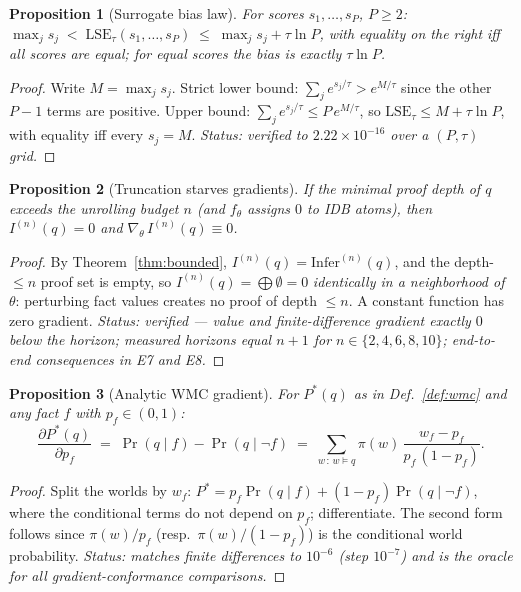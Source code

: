 \documentclass[10pt]{article}
\newtheorem{proposition}{Proposition}
\theoremstyle{remark}
\newcommand{\Infer}{\mathrm{Infer}}
\begin{document}
\begin{proposition}[Surrogate bias law]\label{prop:lse}
For scores $s_1,\dots,s_P$, $P \ge 2$:
$\max_j s_j \;<\; \mathrm{LSE}_\tau(s_1,\dots,s_P) \;\le\; \max_j s_j + \tau\ln P$,
with equality on the right iff all scores are equal; for equal scores the bias is exactly
$\tau\ln P$.
\end{proposition}
\begin{proof}
Write $M = \max_j s_j$. Strict lower bound: $\sum_j e^{s_j/\tau} > e^{M/\tau}$ since the other
$P-1$ terms are positive. Upper bound: $\sum_j e^{s_j/\tau} \le P\,e^{M/\tau}$, so
$\mathrm{LSE}_\tau \le M + \tau\ln P$, with equality iff every $s_j = M$. \emph{Status: verified to
$2.22\times10^{-16}$ over a $(P,\tau)$ grid.}
\end{proof}

\begin{proposition}[Truncation starves gradients]\label{prop:trunc}
If the minimal proof depth of $q$ exceeds the unrolling budget $n$ (and $f_\theta$ assigns $0$ to
IDB atoms), then $I^{(n)}(q) = 0$ and $\nabla_\theta\, I^{(n)}(q) \equiv 0$.
\end{proposition}
\begin{proof}
By Theorem~\ref{thm:bounded}, $I^{(n)}(q) = \Infer^{(n)}(q)$, and the depth-$\le n$ proof set is
empty, so $I^{(n)}(q) = \bigoplus\emptyset = 0$ \emph{identically in a neighborhood of} $\theta$:
perturbing fact values creates no proof of depth $\le n$. A constant function has zero gradient.
\emph{Status: verified --- value and finite-difference gradient exactly $0$ below the horizon;
measured horizons equal $n+1$ for $n \in \{2,4,6,8,10\}$; end-to-end consequences in E7 and E8.}
\end{proof}

\begin{proposition}[Analytic WMC gradient]\label{prop:grad}
For $P^*(q)$ as in Def.~\ref{def:wmc} and any fact $f$ with $p_f \in (0,1)$:
\[
\frac{\partial P^*(q)}{\partial p_f} \;=\; \Pr(q \mid f) - \Pr(q \mid \neg f)
\;=\; \sum_{w \,:\, w\models q} \pi(w)\,\frac{w_f - p_f}{p_f\,(1-p_f)} .
\]
\end{proposition}
\begin{proof}
Split the worlds by $w_f$: $P^* = p_f \Pr(q\mid f) + (1-p_f)\Pr(q\mid\neg f)$, where the
conditional terms do not depend on $p_f$; differentiate. The second form follows since
$\pi(w)/p_f$ (resp.\ $\pi(w)/(1-p_f)$) is the conditional world probability. \emph{Status: matches
finite differences to $10^{-6}$ (step $10^{-7}$) and is the oracle for all gradient-conformance
comparisons.}
\end{proof}
\end{document}
